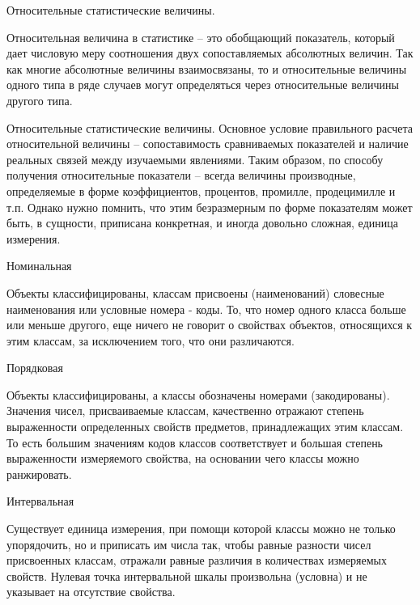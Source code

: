 \documentclass{beamer}
\begin{document}
\begin{frame}{Относительные статистические величины.}

Относительная величина в статистике – это обобщающий показатель, который дает числовую меру соотношения двух сопоставляемых абсолютных величин. Так как многие абсолютные величины взаимосвязаны, то и относительные величины одного типа в ряде случаев могут определяться через относительные величины другого типа.

\end{frame}

\begin{frame}{Относительные статистические величины.}
Основное условие правильного расчета относительной величины – сопоставимость сравниваемых показателей и наличие реальных связей между изучаемыми явлениями. Таким образом, по способу получения относительные показатели – всегда величины производные, определяемые в форме коэффициентов, процентов, промилле, продецимилле и т.п. Однако нужно помнить, что этим безразмерным по форме показателям может быть, в сущности, приписана конкретная, и иногда довольно сложная, единица измерения. 


\end{frame}


\begin{frame}{Номинальная}

Объекты классифицированы, классам присвоены
(наименований) словесные наименования или условные номера -
коды. То, что номер одного класса больше или
меньше другого, еще ничего не говорит о свойствах объектов, относящихся к этим классам, за
исключением того, что они различаются.

\end{frame}


\begin{frame}{Порядковая}

Объекты классифицированы, а классы обозначены номерами (закодированы). Значения чисел, 
присваиваемые классам, качественно отражают степень выраженности определенных свойств предметов, 
принадлежащих этим классам. То есть большим
значениям кодов классов соответствует и большая
степень выраженности измеряемого свойства, на
основании чего классы можно ранжировать.

\end{frame}

\begin{frame}{Интервальная}

 Существует единица измерения, при помощи которой классы можно не только 
 упорядочить, но и
приписать им числа так, чтобы равные разности
чисел присвоенных классам, отражали равные различия 
в количествах измеряемых свойств. Нулевая
точка интервальной шкалы произвольна (условна)
и не указывает на отсутствие свойства.


  
\end{frame}
\end{document}
